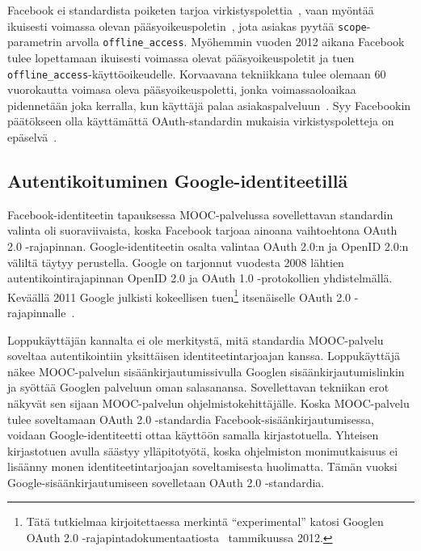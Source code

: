 \documentclass[finnish,gradu]{tktltiki}
\begin{document}
  Facebook ei standardista poiketen tarjoa virkistyspolettia~\cite{bradley_facebook_refresh_tokens_2012}, vaan myöntää ikuisesti voimassa olevan pääsyoikeuspoletin~\cite{facebook_oauth2_doc}, jota asiakas pyytää \verb!scope!-parametrin arvolla \verb!offline_access!. Myöhemmin vuoden 2012 aikana Facebook tulee lopettamaan ikuisesti voimassa olevat pääsyoikeuspoletit ja tuen \verb!offline_access!-käyttöoikeudelle. Korvaavana tekniikkana tulee olemaan 60 vuorokautta voimasa oleva pääsyoikeuspoletti, jonka voimassaoloaikaa pidennetään joka kerralla, kun käyttäjä palaa asiakaspalveluun~\cite{facebook_oauth2_deprecate_offline, facebook_oauth2_deprecate_offline_mailinglist}. Syy Facebookin päätökseen olla käyttämättä OAuth-standardin mukaisia virkistyspoletteja on epäselvä~\cite{sakimura_facebook_refresh_tokens_2012}.




  \subsection{Autentikoituminen Google-identiteetillä} %
  \label{sub:mooc_google_auth}

  Facebook-identiteetin tapauksessa MOOC-palvelussa sovellettavan standardin valinta oli suoraviivaista, koska Facebook tarjoaa ainoana vaihtoehtona OAuth 2.0 -rajapinnan. Google-identiteetin osalta valintaa OAuth 2.0:n ja OpenID 2.0:n väliltä täytyy perustella.
  Google on tarjonnut vuodesta 2008 lähtien autentikointirajapinnan OpenID 2.0 ja OAuth 1.0 -protokollien yhdistelmällä. Keväällä 2011 Google julkisti kokeellisen tuen\footnote{
  Tätä tutkielmaa kirjoitettaessa merkintä ``experimental'' katosi Googlen OAuth 2.0 -rajapintadokumentaatiosta~\cite{google_oauth2_doc} tammikuussa 2012.
  } itsenäiselle OAuth 2.0 -rajapinnalle~\cite{google_oauth2_announcement_2011}.

  Loppukäyttäjän kannalta ei ole merkitystä, mitä standardia MOOC-palvelu soveltaa autentikointiin yksittäisen identiteetintarjoajan kanssa. Loppukäyttäjä näkee MOOC-palvelun sisäänkirjautumissivulla Googlen sisäänkirjautumislinkin ja syöttää Googlen palveluun oman salasanansa. Sovellettavan tekniikan erot näkyvät sen sijaan MOOC-palvelun ohjelmistokehittäjälle. Koska MOOC-palvelu tulee soveltamaan OAuth 2.0 -standardia Facebook-sisäänkirjautumisessa, voidaan Google-identiteetti ottaa käyttöön samalla kirjastotuella. Yhteisen kirjastotuen avulla säästyy ylläpitotyötä, koska ohjelmiston monimutkaisuus ei lisäänny monen identiteetintarjoajan soveltamisesta huolimatta. Tämän vuoksi Google-sisäänkirjautumiseen sovelletaan OAuth 2.0 -standardia.
\end{document}
